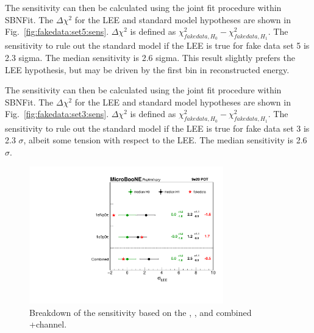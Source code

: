 The sensitivity can then be calculated using the joint fit procedure within SBNFit. The $\Delta \chi^{2}$ for the LEE and standard model hypotheses are shown in Fig.~\ref{fig:fakedata:set5:sens}.  $\Delta \chi^{2}$ is defined as $\chi^{2}_{fakedata, H_{0}}-\chi^{2}_{fakedata, H_{1}}$. The sensitivity to rule out the standard model if the LEE is true for fake data set 5 is 2.3 sigma.  The median sensitivity is 2.6 sigma. This result slightly prefers the LEE hypothesis, but may be driven by the first bin in reconstructed energy.

The sensitivity can then be calculated using the joint fit procedure within SBNFit. The $\Delta \chi^{2}$ for the LEE and standard model hypotheses are shown in Fig.~\ref{fig:fakedata:set3:sens}.  $\Delta \chi^{2}$ is defined as $\chi^{2}_{fakedata, H_{0}}-\chi^{2}_{fakedata, H_{1}}$. The sensitivity to rule out the standard model if the LEE is true for fake data set 3 is 2.3 $\sigma$, albeit some tension with respect to the LEE.  The median sensitivity is 2.6 $\sigma$.

\begin{figure}[H]
\begin{center}
\includegraphics[width=0.75\textwidth]{Fakedata/set5/plotSig_constrained_set5.pdf}
\caption{\label{fig:fakedata:set3:combinedSig} Breakdown of the sensitivity based on the \npsel, \zpsel, and combined \npsel+\zpsel channel.}
\end{center}
\end{figure}

